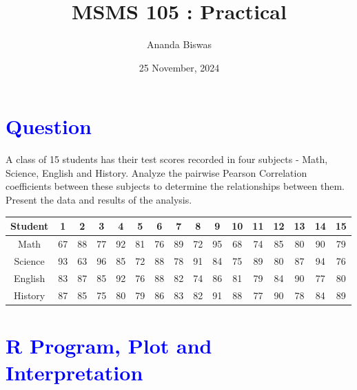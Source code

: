 \documentclass[11pt, a4paper]{article}\usepackage[]{graphicx}\usepackage[]{xcolor}
\title{MSMS 105 : Practical}
\author{Ananda Biswas}
\date{25 November, 2024}
\begin{document}
\maketitle


\section*{\faArrowAltCircleRight[regular] \textcolor{blue}{Question}}

\hspace{1cm} A class of 15 students has their test scores recorded in four subjects - Math, Science, English and History. Analyze the pairwise Pearson Correlation coefficients between these subjects to determine the relationships between them. Present the data and results of the analysis.

\begin{table}[!htbp]
\def\arraystretch{1.5}

\begin{center}
\begin{tabular}{|c||c|c|c|c|c|c|c|c|c|c|c|c|c|c|c|}

\hline

Student & 1 & 2 & 3 & 4 & 5 & 6 & 7 & 8 & 9 & 10 & 11 & 12 & 13 & 14 & 15 \\

\hline
\hline

Math & 67 & 88 & 77 & 92 & 81 & 76 & 89 & 72 & 95 & 68 & 74 & 85 & 80 & 90 & 79 \\

\hline

Science & 93 & 63 & 96 & 85 & 72 & 88 & 78 & 91 & 84 & 75 & 89 & 80 & 87 & 94 & 76 \\

\hline

English & 83 & 87 & 85 & 92 & 76 & 88 & 82 & 74 & 86 & 81 & 79 & 84 & 90 & 77 & 80 \\

\hline

History & 87 & 85 & 75 & 80 & 79 & 86 & 83 & 82 & 91 & 88 & 77 & 90 & 78 & 84 & 89 \\

\hline

\end{tabular}
\end{center}
\end{table}




\section*{\faArrowAltCircleRight[regular] \textcolor{blue}{R Program, Plot and Interpretation}}
\end{document}
